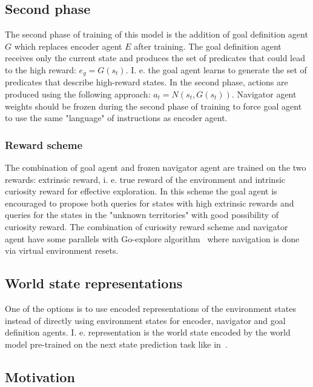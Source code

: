 \documentclass{article}
\begin{document}
\subsection{Second phase}

The second phase of training of this model is the addition of goal definition agent $G$ which replaces encoder agent $E$ after training. The goal definition agent receives only the current state and produces the set of predicates that could lead to the high reward: $e_g = G(s_t)$. I. e. the goal agent learns to generate the set of predicates that describe high-reward states. In the second phase, actions are produced using the following approach: $a_t = N(s_t, G(s_t))$. Navigator agent weights should be frozen during the second phase of training to force goal agent to use the same "language" of instructions as encoder agent.

\subsubsection{Reward scheme}

The combination of goal agent and frozen navigator agent are trained on the two rewards: extrinsic reward, i. e. true reward of the environment and intrinsic curiosity reward for effective exploration. In this scheme the goal agent is encouraged to propose both queries for states with high extrinsic rewards and queries for the states in the "unknown territories" with good possibility of curiosity reward. The combination of curiosity reward scheme and navigator agent have some parallels with Go-explore algorithm~\citep{Ecoffet2019GoExploreAN} where navigation is done via virtual environment resets.

\subsection{World state representations}

One of the options is to use encoded representations of the environment states instead of directly using environment states for encoder, navigator and goal definition agents. I. e. representation is the world state encoded by the world model pre-trained on the next state prediction task like in~\citep{Ha2018RecurrentWM}.

\subsection{Motivation}
\end{document}
